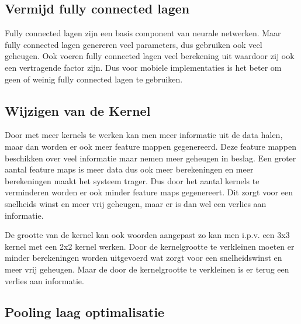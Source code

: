 \subsection{Vermijd fully connected lagen}
Fully connected lagen zijn een basis component van neurale netwerken.
Maar fully connected lagen genereren veel parameters, dus gebruiken ook veel geheugen.
Ook voeren fully connected lagen veel berekening uit waardoor zij ook een vertragende factor zijn.
Dus voor mobiele implementaties is het beter om geen of weinig fully connected lagen te gebruiken.

\subsection{Wijzigen van de Kernel}
Door met meer kernels te werken kan men meer informatie uit de data halen, maar dan worden er ook meer feature mappen gegenereerd.
Deze feature mappen beschikken over veel informatie maar nemen meer geheugen in beslag.
Een groter aantal feature maps is meer data dus ook meer berekeningen en meer berekeningen maakt het systeem trager.
Dus door het aantal kernels te verminderen worden er ook minder feature maps gegenereert.
Dit zorgt voor een snelheids winst en meer vrij geheugen, maar er is dan wel een verlies aan informatie.

De grootte van de kernel kan ook woorden aangepast zo kan men i.p.v. een 3x3 kernel met een 2x2 kernel werken.
Door de kernelgrootte te verkleinen moeten er minder berekeningen worden uitgevoerd wat zorgt voor een snelheidswinst en meer vrij geheugen.
Maar de door de kernelgrootte te verkleinen is er terug een verlies aan informatie.

\subsection{Pooling laag optimalisatie}

